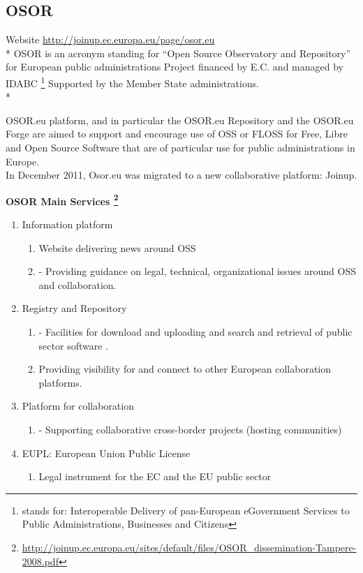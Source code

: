 \documentclass[11pt]{article} %
\begin{document}
\subsection{OSOR} %
Website \url {http://joinup.ec.europa.eu/page/osor.eu}\\*
OSOR is an acronym standing for “Open Source Observatory and Repository” for European public administrations
Project financed by E.C. and managed by IDABC \footnote {stands for:
Interoperable Delivery of pan-European eGovernment Services to Public Administrations,
Businesses and Citizens}
Supported by the Member State administrations.\\*

 OSOR.eu platform, and in particular the OSOR.eu Repository and the OSOR.eu Forge are aimed to support and encourage use of OSS or FLOSS for Free, Libre and Open Source Software that are of particular use for public administrations in Europe. \\
In December 2011, Osor.eu was migrated to a new collaborative platform: Joinup.

{\bf OSOR Main Services \footnote {\url{http://joinup.ec.europa.eu/sites/default/files/OSOR_dissemination-Tampere-2008.pdf}}}

\begin{enumerate}
   \item Information platform
  \begin{enumerate}
		\item Website delivering news around OSS
		 \item -  Providing guidance on legal, technical, organizational issues around OSS and collaboration.
	\end {enumerate}
   \item Registry and Repository
	\begin{enumerate}
		\item -  Facilities for download and uploading and search and retrieval of public sector software .
		\item Providing visibility for and connect to other European collaboration platforms.
	\end {enumerate}
   \item  Platform for collaboration 
	\begin{enumerate}
		\item - Supporting collaborative cross-border projects (hosting communities)
	\end {enumerate}
  \item EUPL: European Union Public License
	\begin{enumerate}
		\item Legal instrument for the EC and the EU public sector
	\end{enumerate}
\end {enumerate}
\end{document}
